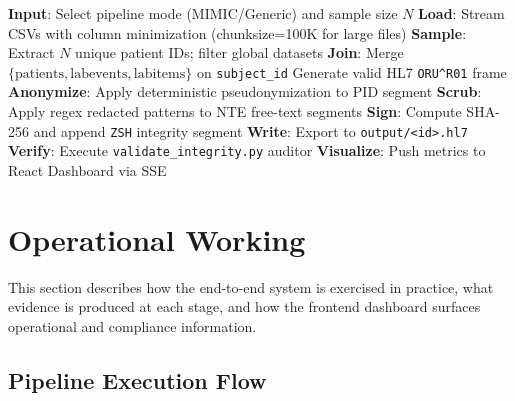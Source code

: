 \documentclass[12pt,a4paper]{report}
\begin{document}
\begin{algorithm}[H]
\caption{Secure HL7 Orchestration Workflow}
\begin{algorithmic}[1]
    \State \textbf{Input}: Select pipeline mode (MIMIC/Generic) and sample size $N$
    \State \textbf{Load}: Stream CSVs with column minimization (chunksize=100K for large files)
    \State \textbf{Sample}: Extract $N$ unique patient IDs; filter global datasets
    \State \textbf{Join}: Merge $\{\text{patients}, \text{labevents}, \text{labitems}\}$ on \texttt{subject\_id}
        \State Generate valid HL7 \texttt{ORU\string^R01} frame
        \State \textbf{Anonymize}: Apply deterministic pseudonymization to PID segment
        \State \textbf{Scrub}: Apply regex redacted patterns to NTE free-text segments
        \State \textbf{Sign}: Compute SHA-256 and append \texttt{ZSH} integrity segment
        \State \textbf{Write}: Export to \texttt{output/<id>.hl7}
    \EndFor
    \State \textbf{Verify}: Execute \texttt{validate\_integrity.py} auditor
    \State \textbf{Visualize}: Push metrics to React Dashboard via SSE
\end{algorithmic}
\end{algorithm}

\section{Operational Working}

This section describes how the end-to-end system is exercised in practice, what
evidence is produced at each stage, and how the frontend dashboard surfaces operational
and compliance information.

\subsection{Pipeline Execution Flow}
\end{document}
